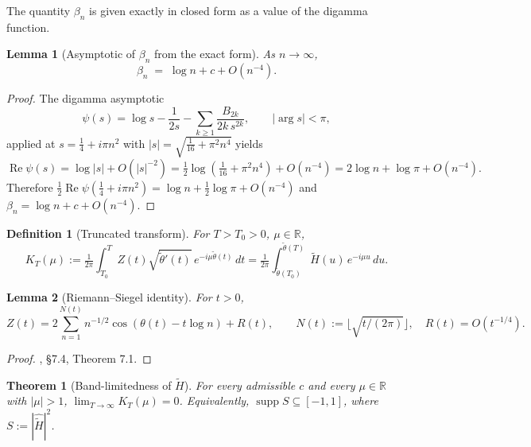 \documentclass[11pt]{article}
\newtheorem{theorem}{Theorem}
\newtheorem{lemma}{Lemma}
\newtheorem{definition}{Definition}
\DeclareMathOperator{\ReOp}{Re}
\let\Re\ReOp
\DeclareMathOperator{\supp}{supp}
\begin{document}
The quantity $\beta_n$ is given exactly in closed form as a value of the digamma function.

\begin{lemma}[Asymptotic of $\beta_n$ from the exact form]\label{lem:betaasymp}
As $n\to\infty$,
\[
\beta_n \;=\; \log n + c + O(n^{-4}).
\]
\end{lemma}

\begin{proof}
The digamma asymptotic
\[
\psi(s) = \log s - \frac{1}{2s} - \sum_{k\ge 1}\frac{B_{2k}}{2k\,s^{2k}},\qquad |\arg s|<\pi,
\]
applied at $s=\tfrac{1}{4}+i\pi n^2$ with $|s|=\sqrt{\tfrac{1}{16}+\pi^2 n^4}$ yields
\[
\Re\psi(s) = \log|s| + O(|s|^{-2}) = \tfrac{1}{2}\log(\tfrac{1}{16}+\pi^2 n^4) + O(n^{-4}) = 2\log n + \log\pi + O(n^{-4}).
\]
Therefore $\tfrac{1}{2}\Re\psi(\tfrac{1}{4}+i\pi n^2) = \log n + \tfrac{1}{2}\log\pi + O(n^{-4})$ and $\beta_n = \log n + c + O(n^{-4})$.
\end{proof}

\begin{definition}[Truncated transform]\label{def:KT}
For $T>T_0>0$, $\mu\in\mathbb{R}$,
\[
K_T(\mu) := \tfrac{1}{2\pi}\int_{T_0}^{T}Z(t)\sqrt{\tilde\theta'(t)}\,e^{-i\mu\tilde\theta(t)}\,dt = \tfrac{1}{2\pi}\int_{\tilde\theta(T_0)}^{\tilde\theta(T)}\tilde H(u)\,e^{-i\mu u}\,du.
\]
\end{definition}

\begin{lemma}[Riemann--Siegel identity]\label{lem:RS}
For $t>0$,
\[
Z(t) = 2\sum_{n=1}^{N(t)}n^{-1/2}\cos(\theta(t)-t\log n) + R(t),\qquad N(t):=\lfloor\sqrt{t/(2\pi)}\rfloor,\quad R(t)=O(t^{-1/4}).
\]
\end{lemma}

\begin{proof}\cite{Edwards}, \S7.4, Theorem 7.1.\end{proof}

\begin{theorem}[Band-limitedness of $\tilde H$]\label{thm:bandlim}
For every admissible $c$ and every $\mu\in\mathbb{R}$ with $|\mu|>1$, $\lim_{T\to\infty}K_T(\mu)=0$. Equivalently, $\supp S\subseteq[-1,1]$, where $S:=|\widehat{\tilde H}|^2$.
\end{theorem}
\end{document}
